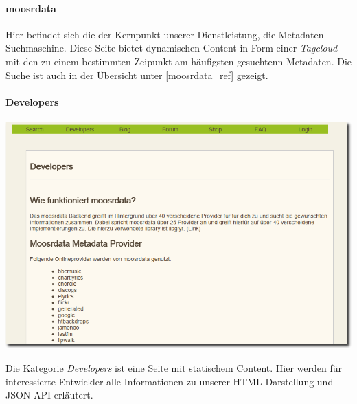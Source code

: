\paragraph{moosrdata}
Hier befindet sich die der Kernpunkt unserer Dienstleistung, die Metadaten
Suchmaschine. Diese Seite bietet dynamischen Content in Form einer
\emph{Tagcloud} mit den zu einem bestimmten Zeipunkt am häufigsten gesuchtenn
Metadaten. Die Suche ist auch in der Übersicht unter \ref{moosrdata_ref}
gezeigt.

\newpage
\paragraph{Developers}
\label{static_page}
\begin{center}
\includegraphics[scale=0.5]{../screenshots/developers.png}
\end{center}

Die Kategorie \emph{Developers} ist eine Seite mit statischem Content. Hier
werden für interessierte Entwickler alle Informationen zu unserer HTML
Darstellung und JSON API erläutert.

